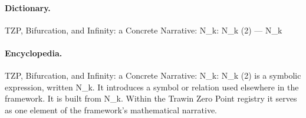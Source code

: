 \paragraph{Dictionary.}
TZP, Bifurcation, and Infinity: a Concrete Narrative: N\_k: N\_k (2) — N\_k

\paragraph{Encyclopedia.}
TZP, Bifurcation, and Infinity: a Concrete Narrative: N\_k: N\_k (2) is a symbolic expression, written N\_k. It introduces a symbol or relation used elsewhere in the framework. It is built from N\_k. Within the Trawin Zero Point registry it serves as one element of the framework's mathematical narrative.
